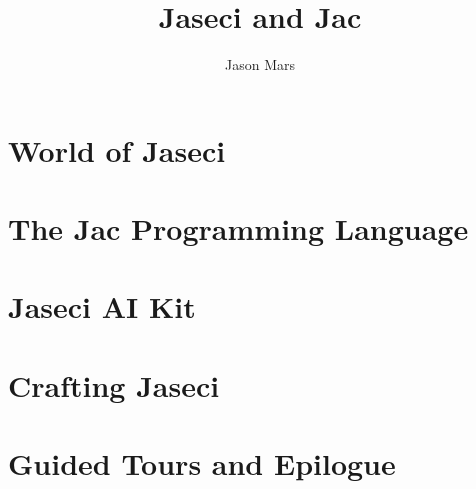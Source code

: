 \documentclass[oneside]{book}
\title{Jaseci and Jac}
\author{Jason Mars}
\begin{document}

\normalem








\part{World of Jaseci}
\label{part:jsword}









\part{The Jac Programming Language}
\label{part:jacd}










\part{Jaseci AI Kit}

\part{Crafting Jaseci}
\label{part:crafting}




\part{Guided Tours and Epilogue}







\appendix








\end{document}
